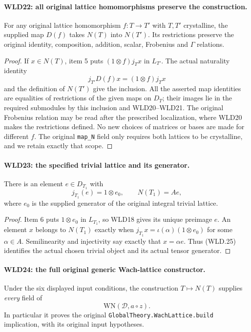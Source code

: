 \documentclass[11pt,a4paper]{article}
\numberwithin{equation}{section}
\theoremstyle{remark}\newtheorem{remark}[theorem]{Remark}
\begin{document}
\paragraph{WLD22: all original lattice homomorphisms preserve the construction.}
\label{claim:WLD22}
For any original lattice homomorphism $f:T\to T'$ with $T,T'$
crystalline, the supplied map $D(f)$ takes $N(T)$ into $N(T')$.
Its restrictions preserve the original identity, composition,
addition, scalar, Frobenius and $\Gamma$ relations.

\begin{proof}
If $x\in N(T)$, item 5 puts
$(1\otimes f)j_Tx$ in $L_{T'}$. The actual naturality identity
\[
                       j_{T'}D(f)x=(1\otimes f)j_Tx
\]
and the definition of $N(T')$ give the inclusion.
All the asserted map identities are equalities of restrictions
of the given maps on $D_T$; their images lie in the required
submodules by this inclusion and WLD20--WLD21. The original
Frobenius relation may be read after the prescribed localization,
where WLD20 makes the restrictions defined.
No new choices of matrices or bases are made for different $f$.
The original \texttt{map\_\allowbreak N} field only requires both lattices
to be crystalline, and we retain exactly that scope.
\end{proof}

\paragraph{WLD23: the specified trivial lattice and its generator.}
\label{claim:WLD23}
There is an element $e\in D_{T_1}$ with
\[
        j_{T_1}(e)=1\otimes e_0,\qquad N(T_1)=Ae,           \tag{WLD.25}
\]
where $e_0$ is the supplied generator of the original integral
trivial lattice.

\begin{proof}
Item 6 puts $1\otimes e_0$ in $L_{T_1}$, so WLD18 gives its
unique preimage $e$. An element $x$ belongs to $N(T_1)$ exactly
when $j_{T_1}x=\iota(\alpha)(1\otimes e_0)$ for some
$\alpha\in A$. Semilinearity and injectivity say exactly that
$x=\alpha e$. Thus (WLD.25) identifies the actual chosen
trivial object and its actual tensor generator.
\end{proof}

\paragraph{WLD24: the full original generic Wach-lattice constructor.}
\label{claim:WLD24}
Under the six displayed input conditions, the construction
$T\mapsto N(T)$ supplies \emph{every} field of
\[
                       \mathrm{WN}(\mathcal D,a\circ z).
\]
In particular it proves the original
\texttt{Global\allowbreak Theory.\allowbreak Wach\allowbreak Lattice.\allowbreak build} implication, with its
original input hypotheses.
\end{document}
